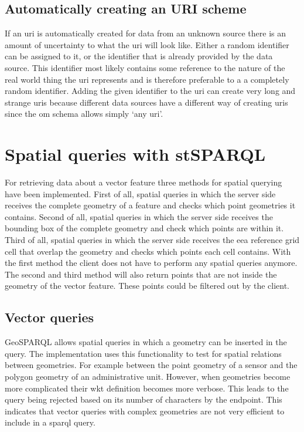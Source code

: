 \subsection{Automatically creating an URI scheme}
If an \ac{uri} is automatically created for data from an unknown source there is an amount of uncertainty to what the \ac{uri} will look like. Either a random identifier can be assigned to it, or the identifier that is already provided by the data source. This identifier most likely contains some reference to the nature of the real world thing the \ac{uri} represents and is therefore preferable to a a completely random identifier. Adding the given identifier to the \ac{uri} can create very long and strange \acp{uri} because different data sources have a different way of creating \acp{uri} since the \ac{om} schema allows simply `any \ac{uri}'.   

\section{Spatial queries with stSPARQL}
\label{par:spQueries}
For retrieving data about a vector feature three methods for spatial querying have been implemented. First of all, spatial queries in which the server side receives the complete geometry of a feature and checks which point geometries it contains. Second of all, spatial queries in which the server side receives the bounding box of the complete geometry and check which points are within it. Third of all, spatial queries in which the server side receives the \ac{eea} reference grid cell that overlap the geometry and checks which points each cell contains. With the first method the client does not have to perform any spatial queries anymore. The second and third method will also return points that are not inside the geometry of the vector feature. These points could be filtered out by the client. 

\subsection{Vector queries}
GeoSPARQL allows spatial queries in which a geometry can be inserted in the query. The implementation uses this functionality to test for spatial relations between geometries. For example between the point geometry of a sensor and the polygon geometry of an administrative unit. However, when geometries become more complicated their \ac{wkt} definition becomes more verbose. This leads to the query being rejected based on its number of characters by the endpoint. This indicates that vector queries with complex geometries are not very efficient to include in a \ac{sparql} query.     

